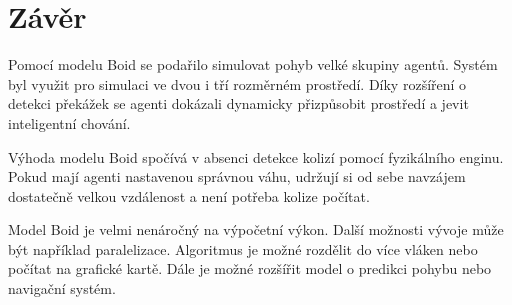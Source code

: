 \section{Závěr}
Pomocí modelu Boid se podařilo simulovat pohyb velké skupiny agentů. Systém byl využit pro simulaci ve dvou i tří rozměrném prostředí. Díky rozšíření o detekci překážek se agenti dokázali dynamicky přizpůsobit prostředí a jevit inteligentní chování. 
\par
Výhoda modelu Boid spočívá v absenci detekce kolizí pomocí fyzikálního enginu. Pokud mají agenti nastavenou správnou váhu, udržují si od sebe navzájem dostatečně velkou vzdálenost a není potřeba kolize počítat. 
\par
Model Boid je velmi nenáročný na výpočetní výkon. Další možnosti vývoje může být například paralelizace. Algoritmus je možné rozdělit do více vláken nebo počítat na grafické kartě. Dále je možné rozšířit model o predikci pohybu nebo navigační systém. 